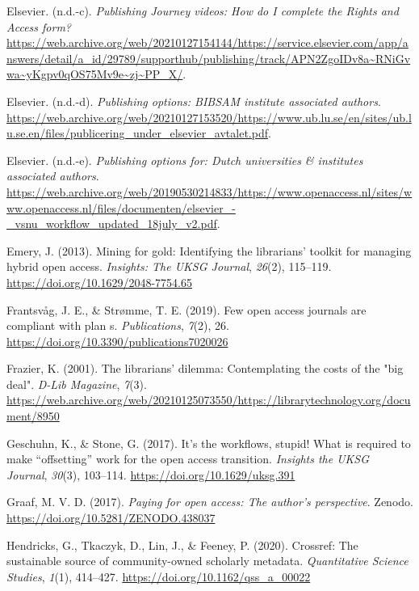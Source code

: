 \documentclass[a4paper,man,floatsintext,longtable,noextraspace,12pt]{apa6}
\newlength{\cslhangindent}
\newenvironment{cslreferences}%
  {\setlength{\parindent}{0pt}%
  \everypar{\setlength{\hangindent}{\cslhangindent}}\ignorespaces}%
  {\par}
\begin{document}
\begin{cslreferences}
\leavevmode\hypertarget{ref-Els_videos}{}%
Elsevier. (n.d.-c). \emph{Publishing Journey videos: How do I complete
the Rights and Access form?}
\url{https://web.archive.org/web/20210127154144/https://service.elsevier.com/app/answers/detail/a_id/29789/supporthub/publishing/track/APN2ZgoIDv8a~RNiGvwa~yKgpv0qOS75Mv9e~zj~PP_X/}.

\leavevmode\hypertarget{ref-lund}{}%
Elsevier. (n.d.-d). \emph{Publishing options: BIBSAM institute
associated authors}.
\url{https://web.archive.org/web/20210127153520/https://www.ub.lu.se/en/sites/ub.lu.se.en/files/publicering_under_elsevier_avtalet.pdf}.

\leavevmode\hypertarget{ref-vsnu}{}%
Elsevier. (n.d.-e). \emph{Publishing options for: Dutch universities \&
institutes associated authors}.
\url{https://web.archive.org/web/20190530214833/https://www.openaccess.nl/sites/www.openaccess.nl/files/documenten/elsevier_-_vsnu_workflow_updated_18july_v2.pdf}.

\leavevmode\hypertarget{ref-Emery_2013}{}%
Emery, J. (2013). Mining for gold: Identifying the librarians' toolkit
for managing hybrid open access. \emph{Insights: The UKSG Journal},
\emph{26}(2), 115--119. \url{https://doi.org/10.1629/2048-7754.65}

\leavevmode\hypertarget{ref-Frantsv_g_2019}{}%
Frantsvåg, J. E., \& Strømme, T. E. (2019). Few open access journals are
compliant with plan s. \emph{Publications}, \emph{7}(2), 26.
\url{https://doi.org/10.3390/publications7020026}

\leavevmode\hypertarget{ref-Frazier_2001}{}%
Frazier, K. (2001). The librarians' dilemma: Contemplating the costs of
the "big deal". \emph{D-Lib Magazine}, \emph{7}(3).
\url{https://web.archive.org/web/20210125073550/https://librarytechnology.org/document/8950}

\leavevmode\hypertarget{ref-Geschuhn_2017}{}%
Geschuhn, K., \& Stone, G. (2017). It's the workflows, stupid! What is
required to make ``offsetting'' work for the open access transition.
\emph{Insights the UKSG Journal}, \emph{30}(3), 103--114.
\url{https://doi.org/10.1629/uksg.391}

\leavevmode\hypertarget{ref-Graaf_2017}{}%
Graaf, M. V. D. (2017). \emph{Paying for open access: The author's
perspective}. Zenodo. \url{https://doi.org/10.5281/ZENODO.438037}

\leavevmode\hypertarget{ref-Hendricks_2020}{}%
Hendricks, G., Tkaczyk, D., Lin, J., \& Feeney, P. (2020). Crossref: The
sustainable source of community-owned scholarly metadata.
\emph{Quantitative Science Studies}, \emph{1}(1), 414--427.
\url{https://doi.org/10.1162/qss_a_00022}


\end{cslreferences}
\end{document}
